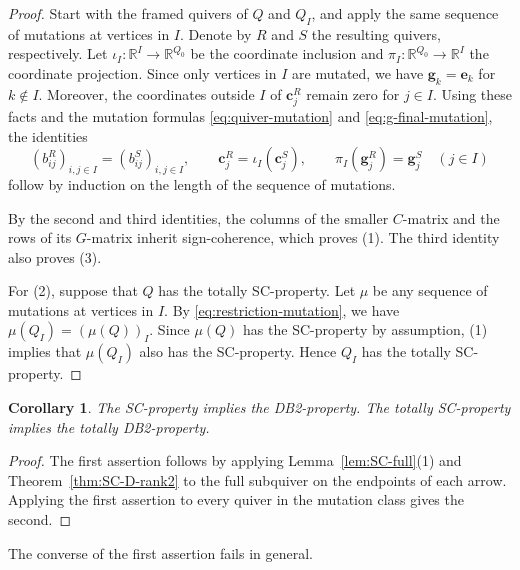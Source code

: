 \documentclass[11pt,reqno]{amsart}
\numberwithin{equation}{section}
\theoremstyle{definition}
\theoremstyle{plain}
\newtheorem{corollary}[example]{Corollary}
\begin{document}
	\begin{proof}
		Start with the framed quivers of $Q$ and $Q_I$, and apply the same sequence of mutations at vertices in $I$. Denote by $R$ and $S$ the resulting quivers, respectively. Let $\iota_I:\mathbb R^I\to\mathbb R^{Q_0}$ be the coordinate inclusion and $\pi_I:\mathbb R^{Q_0}\to\mathbb R^I$ the coordinate projection. Since only vertices in $I$ are mutated, we have $\mathbf{g}_k=\mathbf{e}_k$ for $k\notin I$. Moreover, the coordinates outside $I$ of $\mathbf{c}_j^R$ remain zero for $j\in I$. Using these facts and the mutation formulas \eqref{eq:quiver-mutation} and \eqref{eq:g-final-mutation}, the identities
		\[
		(b_{ij}^R)_{i,j\in I}=(b_{ij}^S)_{i,j\in I},\qquad
		\mathbf c_j^R=\iota_I(\mathbf c_j^S),\qquad
		\pi_I(\mathbf g_j^R)=\mathbf g_j^S\quad(j\in I)
		\]
		follow by induction on the length of the sequence of mutations.
		
		By the second and third identities, the columns of the smaller $C$-matrix and the rows of its $G$-matrix inherit sign-coherence, which proves (1). The third identity also proves (3).
		
		For (2), suppose that $Q$ has the totally SC-property. Let $\mu$ be any sequence of mutations at vertices in $I$. By \eqref{eq:restriction-mutation}, we have $\mu(Q_I)=(\mu(Q))_I$. Since $\mu(Q)$ has the SC-property by assumption, (1) implies that $\mu(Q_I)$ also has the SC-property. Hence $Q_I$ has the totally SC-property.
	\end{proof}
	
	\begin{corollary}\label{cor:SC-D}
		The SC-property implies the DB2-property. The totally SC-property implies the totally DB2-property.
	\end{corollary}
	
	\begin{proof}
		The first assertion follows by applying Lemma~\ref{lem:SC-full}(1) and Theorem~\ref{thm:SC-D-rank2} to the full subquiver on the endpoints of each arrow. Applying the first assertion to every quiver in the mutation class gives the second.
	\end{proof}
	
	The converse of the first assertion fails in general.
	
\end{document}
